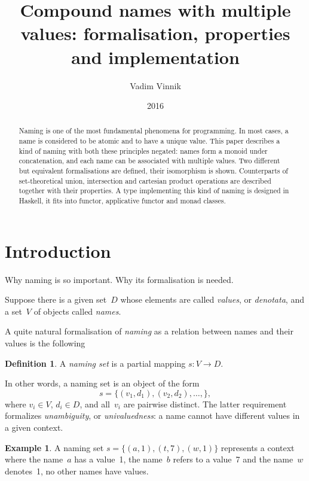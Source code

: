 \documentclass{article}
\title{Compound names with multiple values: formalisation, properties and implementation}
\author{Vadim Vinnik}
\date{2016}
\theoremstyle{definition}
\newtheorem{Df}{Definition}
\newtheorem{Ex}{Example}
\begin{document}
\maketitle

\begin{abstract}
Naming is one of the most fundamental phenomena for programming.  In most
cases, a name is considered to be atomic and to have a unique value.  This
paper describes a kind of naming with both these principles negated: names form
a monoid under concatenation, and each name can be associated with multiple
values.  Two different but equivalent formalisations are defined, their
isomorphism is shown.  Counterparts of set-theoretical union, intersection and
cartesian product operations are described together with their properties.  A
type implementing this kind of naming is designed in Haskell, it fits into
functor, applicative functor and monad classes.
\end{abstract}

\tableofcontents



\section{Introduction}

Why naming is so important. Why its formalisation is needed.

Suppose there is a given set~$D$ whose elements are called \emph{values}, or
\emph{denotata}, and a set~$V$ of objects called \emph{names}.

A quite natural formalisation of \emph{naming} as a relation between names and
their values is the following
\begin{Df}\label{df:naming-set}
A \emph{naming set} is a partial mapping $s: V\to D$.
\end{Df}

In other words, a naming set is an object of the form
\[
  s = \{ (v_1, d_1), (v_2, d_2), \ldots, \} ,
\]
where $v_i\in V$, $d_i\in D$, and all~$v_i$ are pairwise distinct. The
latter requirement formalizes \emph{unambiguity}, or \emph{univaluedness}: a
name cannot have different values in a given context.

\begin{Ex}\label{ex:naming-set}
A naming set $s = \{ (a, 1), (t, 7), (w, 1) \}$ represents a context where
the name~$a$ has a value~1, the name~$b$ refers to a value~7 and the name~$w$
denotes~1, no other names have values.
\end{Ex}
\end{document}

